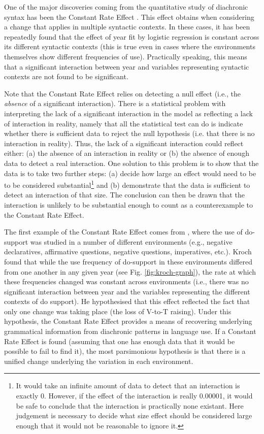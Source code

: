 	One of the major discoveries coming from the quantitative study of diachronic syntax has been the Constant Rate Effect \citep{Kroch.1989,Kroch.1994}. This effect obtains when considering a change that applies in multiple syntactic contexts. In these cases, it has been repeatedly found that the effect of year fit by logistic regression is constant across its different syntactic contexts (this is true even in cases where the environments themselves show different frequencies of use). Practically speaking, this means that a significant interaction between year and variables representing syntactic contexts are not found to be significant.

	Note that the Constant Rate Effect relies on detecting a null effect (i.e., the \textit{absence} of a significant interaction). There is a statistical problem with interpreting the lack of a significant interaction in the model as reflecting a lack of interaction in reality, namely that all the statistical test can do is indicate whether there is sufficient data to reject the null hypothesis (i.e. that there is no interaction in reality). Thus, the lack of a significant interaction could reflect either: (a) the absence of an interaction in reality or (b) the absence of enough data to detect a real interaction. One solution to this problem is to show that the data is to take two further steps: (a) decide how large an effect would need to be to be considered substantial\footnote{It would take an infinite amount of data to detect that an interaction is exactly 0. However, if the effect of the interaction is really 0.00001, it would be safe to conclude that the interaction is practically none existant. Here judgement is necessary to decide what size effect should be considered large enough that it would not be reasonable to ignore it.} and (b) demonstrate that the data is sufficient to detect an interaction of that size. The conclusion can then be drawn that the interaction is unlikely to be substantial enough to count as a counterexample to the Constant Rate Effect.

	The first example of the Constant Rate Effect comes from \cite{Kroch.1989}, where the use of do-support was studied in a number of different environments (e.g., negative declaratives, affirmative questions, negative questions, imperatives, etc.). Kroch found that while the use frequency of do-support in these environments differed from one another in any given year (see Fig. \ref{fig:kroch-graph}), the rate at which these frequencies changed was constant across environments (i.e., there was no significant interaction between year and the variables representing the different contexts of do support). He hypothesised that this effect reflected the fact that only one change was taking place (the loss of V-to-T raising). Under this hypothesis, the Constant Rate Effect provides a means of recovering underlying grammatical information from diachronic patterns in language use. If a Constant Rate Effect is found (assuming that one has enough data that it would be possible to fail to find it), the most parsimonious hypothesis is that there is a unified change underlying the variation in each environment.

